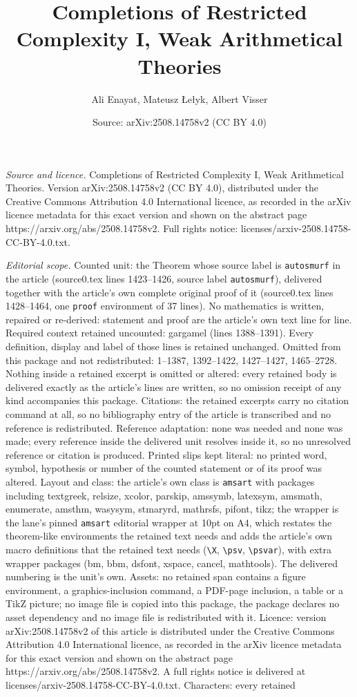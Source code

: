 \documentclass[10pt,a4paper]{amsart}
\title[Completions of Restricted Complexity I, Weak Arithmetical Th]{Completions of Restricted Complexity I, Weak Arithmetical Theories}
\author{Ali Enayat, Mateusz {\L}e{\l}yk, Albert Visser}
\date{Source: arXiv:2508.14758v2 (CC BY 4.0)}
\begin{document}
\maketitle

\noindent\emph{Source and licence.} Completions of Restricted Complexity I, Weak Arithmetical Theories. Version arXiv:2508.14758v2 (CC BY 4.0), distributed under the Creative Commons Attribution 4.0 International licence, as recorded in the arXiv licence metadata for this exact version and shown on the abstract page https://arxiv.org/abs/2508.14758v2. Full rights notice: licenses/arxiv-2508.14758-CC-BY-4.0.txt.\par\smallskip

\noindent\textit{Editorial scope.} Counted unit: the Theorem whose source label is \texttt{autosmurf} in the article (source0.tex lines 1423--1426, source label \texttt{autosmurf}), delivered together with the article's own complete original proof of it (source0.tex lines 1428--1464, one \texttt{proof} environment of 37 lines). No mathematics is written, repaired or re-derived: statement and proof are the article's own text line for line. Required context retained uncounted: gargamel (lines 1388--1391). Every definition, display and label of those lines is retained unchanged. Omitted from this package and not redistributed: 1--1387, 1392--1422, 1427--1427, 1465--2728. Nothing inside a retained excerpt is omitted or altered: every retained body is delivered exactly as the article's lines are written, so no omission receipt of any kind accompanies this package. Citations: the retained excerpts carry no citation command at all, so no bibliography entry of the article is transcribed and no reference is redistributed. Reference adaptation: none was needed and none was made; every reference inside the delivered unit resolves inside it, so no unresolved reference or citation is produced. Printed slips kept literal: no printed word, symbol, hypothesis or number of the counted statement or of its proof was altered. Layout and class: the article's own class is \texttt{amsart} with packages including textgreek, relsize, xcolor, parskip, amssymb, latexsym, amsmath, enumerate, amsthm, wasysym, stmaryrd, mathrsfs, pifont, tikz; the wrapper is the lane's pinned \texttt{amsart} editorial wrapper at 10pt on A4, which restates the theorem-like environments the retained text needs and adds the article's own macro definitions that the retained text needs (\texttt{\textbackslash X}, \texttt{\textbackslash psv}, \texttt{\textbackslash psvar}), with extra wrapper packages (bm, bbm, dsfont, xspace, cancel, mathtools). The delivered numbering is the unit's own. Assets: no retained span contains a figure environment, a graphics-inclusion command, a PDF-page inclusion, a table or a TikZ picture; no image file is copied into this package, the package declares no asset dependency and no image file is redistributed with it. Licence: version arXiv:2508.14758v2 of this article is distributed under the Creative Commons Attribution 4.0 International licence, as recorded in the arXiv licence metadata for this exact version and shown on the abstract page https://arxiv.org/abs/2508.14758v2. A full rights notice is delivered at licenses/arxiv-2508.14758-CC-BY-4.0.txt. Characters: every retained 
\end{document}
